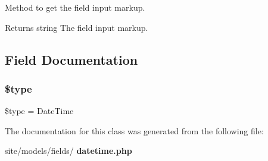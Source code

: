 Method to get the field input markup.

\begin{DoxyReturn}{Returns}
string The field input markup. 
\end{DoxyReturn}


\subsection{Field Documentation}
\mbox{\label{class_j_form_field_date_time_a9a4a6fba2208984cabb3afacadf33919}} 
\subsubsection{\$type}
{\footnotesize\ttfamily \$type = \textquotesingle{}Date\+Time\textquotesingle{}\hspace{0.3cm}{\ttfamily [protected]}}



The documentation for this class was generated from the following file\+:\begin{DoxyCompactItemize}
\item 
site/models/fields/\textbf{ datetime.\+php}\end{DoxyCompactItemize}
